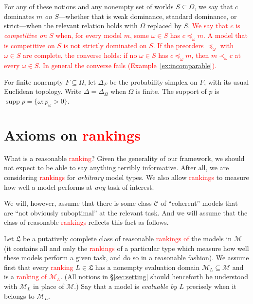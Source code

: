 \documentclass[11pt]{article}
\theoremstyle{definition}
\theoremstyle{remark}
\newcommand{\M}{\mathcal M}
\newcommand{\C}{\mathcal C}
\newcommand{\supp}{\operatorname{supp}}
\begin{document}
For any of these notions and any nonempty set of worlds $S\subseteq\Omega$, we say that $c$ dominates $m$ \emph{on $S$}---whether that is weak dominance, standard dominance, or strict---when the relevant relation holds with $\Omega$ replaced by $S$. \textcolor{red}{We say that $c$ is \emph{competitive on $S$} when, for every model $m$, some $\omega\in S$ has $c\preceq_\omega m$. A model that is competitive on $S$ is not strictly dominated on $S$. If the preorders $\preceq_\omega$ with $\omega\in S$ are complete, the converse holds: if no $\omega\in S$ has $c\preceq_\omega m$, then $m\prec_\omega c$ at every $\omega\in S$. In general the converse fails (Example~\ref{ex:incomparable}).}

For finite nonempty $F\subseteq\Omega$, let $\Delta_F$ be the probability simplex on $F$, with its usual Euclidean topology. Write $\Delta=\Delta_\Omega$ when $\Omega$ is finite. The support of $p$ is $\supp p=\{\omega:p_\omega>0\}$.



\section{Axioms on \textcolor{red}{rankings}}\label{sec:axioms}

What is a reasonable \textcolor{red}{ranking}? Given the generality of our framework, we should not expect to be able to say anything terribly informative. After all, we are considering \textcolor{red}{rankings} for \textit{arbitrary} model types. We also allow \textcolor{red}{rankings} to measure how well a model performs at \textit{any} task of interest.



We will, however, assume that there is some class $\C$ of ``coherent'' models that are ``not obviously suboptimal'' at the relevant task. And we will assume that the class of reasonable \textcolor{red}{rankings} reflects this fact as follows. 


Let $\mathfrak L$ be a putatively complete class of reasonable \textcolor{red}{rankings of} the models in $\M$ (it contains all and only the \textcolor{red}{rankings} of a particular type which measure how well these models perform a given task, and do so in a reasonable fashion). We assume first that every \textcolor{red}{ranking} $L\in\mathfrak L$ has a nonempty evaluation domain $\M_L\subseteq\M$ and is a \textcolor{red}{ranking of $\M_L$}. (All notions in \S\ref{sec:setting} should henceforth be understood with $\M_L$ in place of $\M$.) Say that a model is \emph{evaluable by $L$} precisely when it belongs to $\M_L$. 
\end{document}
